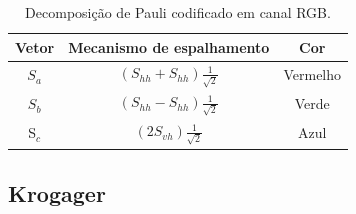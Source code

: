 \documentclass{article}
\begin{document}
\begin{table}[H]
    \centering
    \begin{tabular}{|c|c|c|}
         \hline
         Vetor & Mecanismo de espalhamento & Cor \\ \hline
         $S_{a}$ & $(S_{hh} + S_{hh}) \frac{1}{\sqrt{2}}$ & Vermelho \\ \hline
         $S_{b}$ & $(S_{hh} - S_{hh}) \frac{1}{\sqrt{2}}$ & Verde \\ \hline
         S$_{c}$ & $(2S_{vh}) \frac{1}{\sqrt{2}}$ & Azul \\ \hline
    \end{tabular}
    \caption{Decomposição de Pauli codificado em canal RGB.}
    \label{tab:code_color_pauli}
\end{table}

\subsection{\textbf{Krogager}}
\end{document}
